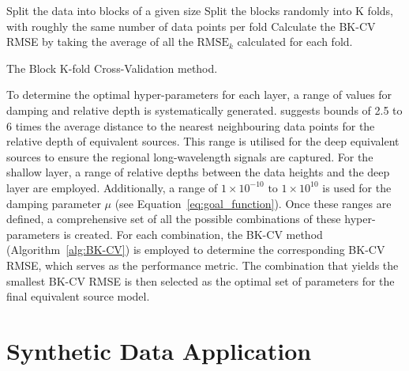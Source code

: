 \begin{algorithm}[!h]
    Split the data into blocks of a given size
    \;
    Split the blocks randomly into K folds, with roughly the same number of data points per fold
    \;
    Calculate the BK-CV RMSE by taking the average of all the $\text{RMSE}_k$ calculated for each fold.
    \BlankLine
    \caption{The Block K-fold Cross-Validation method.}
    \label{alg:BK-CV}
\end{algorithm}

To determine the optimal hyper-parameters for each layer, a range of values for damping and relative depth is systematically generated. \citet{Dampney1969} suggests bounds of 2.5 to 6 times the average distance to the nearest neighbouring data points for the relative depth of equivalent sources. This range is utilised for the deep equivalent sources to ensure the regional long-wavelength signals are captured. For the shallow layer, a range of relative depths between the data heights and the deep layer are employed. Additionally, a range of $1 \times 10^{-10} \text{ to } 1 \times 10^{10}$ is used for the damping parameter $\mu$ (see Equation~\ref{eq:goal_function}). Once these ranges are defined, a comprehensive set of all the possible combinations of these hyper-parameters is created. For each combination, the BK-CV method (Algorithm~\ref{alg:BK-CV}) is employed to determine the corresponding BK-CV RMSE, which serves as the performance metric. The combination that yields the smallest BK-CV RMSE is then selected as the optimal set of parameters for the final equivalent source model.


\section{Synthetic Data Application}

